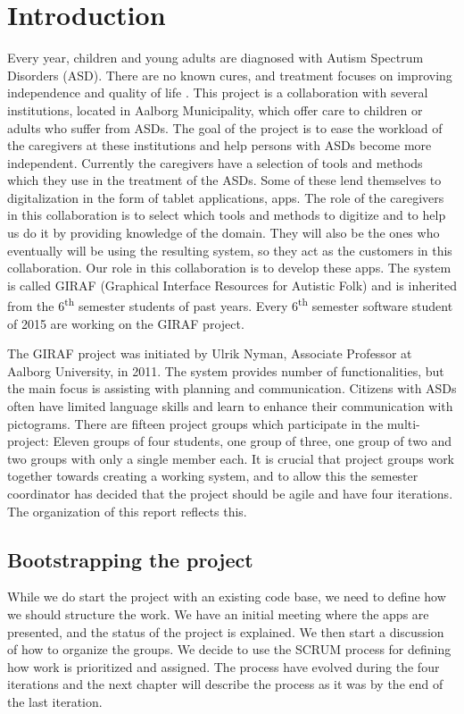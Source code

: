 \chapter{Introduction}
Every year, children and young adults are diagnosed with Autism Spectrum Disorders (ASD). There are no known cures, and treatment focuses on improving independence and quality of life \cite{Myers01112007}. This project is a collaboration with several institutions, located in Aalborg Municipality, which offer care to children or adults who suffer from ASDs. The goal of the project is to ease the workload of the caregivers at these institutions and help persons with ASDs become more independent. Currently the caregivers have a selection of tools and methods which they use in the treatment of the ASDs. Some of these lend themselves to digitalization in the form of tablet applications, apps. The role of the caregivers in this collaboration is to select which tools and methods to digitize and to help us do it by providing knowledge of the domain. They will also be the ones who eventually will be using the resulting system, so they act as the customers in this collaboration. Our role in this collaboration is to develop these apps. The system is called GIRAF (Graphical Interface Resources for Autistic Folk) and is inherited from the 6\textsuperscript{th} semester students of past years. Every 6\textsuperscript{th} semester software student of 2015 are working on the GIRAF project.

The GIRAF project was initiated by Ulrik Nyman, Associate Professor at Aalborg University, in 2011. The system provides number of functionalities, but the main focus is assisting with planning and communication. Citizens with ASDs often have limited language skills and learn to enhance their communication with pictograms. There are fifteen project groups which participate in the multi-project: Eleven groups of four students, one group of three, one group of two and two groups with only a single member each. It is crucial that project groups work together towards creating a working system, and to allow this the semester coordinator has decided that the project should be agile and have four iterations. The organization of this report reflects this.

\section{Bootstrapping the project}
While we do start the project with an existing code base, we need to define how we should structure the work. We have an initial meeting where the apps are presented, and the status of the project is explained. We then start a discussion of how to organize the groups. We decide to use the SCRUM process for defining how work is prioritized and assigned. The process have evolved during the four iterations and the next chapter will describe the process as it was by the end of the last iteration.

